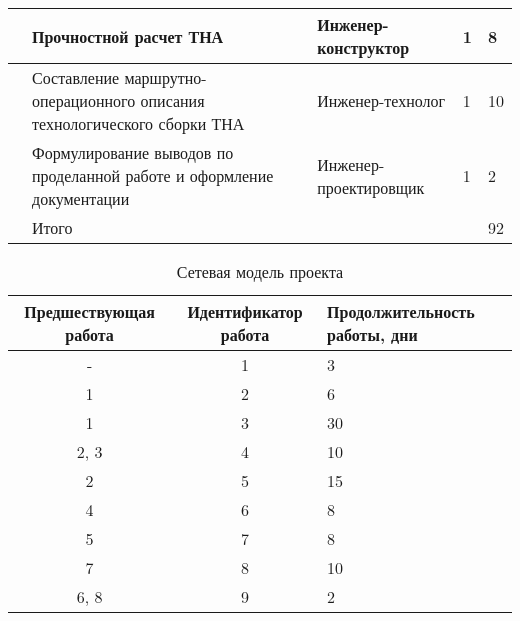 \begin{longtable}{|p{.5cm}|p{4cm}|p{4cm}|p{2.8cm}|p{3cm}|}
	\hline \addtocounter{opnum}{1}
	\theopnum   & Прочностной расчет ТНА                                                       & Инженер-конструктор   & 1                       & 8                                   \\
	\hline \addtocounter{opnum}{1}
	\theopnum   & Составление маршрутно-операционного описания технологического сборки ТНА     & Инженер-технолог      & 1                       & 10                                  \\
	\hline \addtocounter{opnum}{1}
	\theopnum   & Формулирование выводов по проделанной работе и оформление документации       & Инженер-проектировщик & 1                       & 2                                   \\
	\hline      & Итого                                                                        &                       &                         & 92                                  \\
	\hline
\end{longtable}

\begin{table}[h]
	\caption{Сетевая модель проекта}\label{tab:web-model-of-proj}
	\begin{tabular}{|c|c|p{4.8cm}|}
		\hline Предшествующая работа & Идентификатор работа & Продолжительность работы, дни \\
		\hline -                     & 1                    & 3                             \\
		\hline 1                     & 2                    & 6                             \\
		\hline 1                     & 3                    & 30                            \\
		\hline 2, 3                  & 4                    & 10                            \\
		\hline 2                     & 5                    & 15                            \\
		\hline 4                     & 6                    & 8                             \\
		\hline 5                     & 7                    & 8                             \\
		\hline 7                     & 8                    & 10                            \\
		\hline 6, 8                  & 9                    & 2                             \\
		\hline
	\end{tabular}
\end{table}

